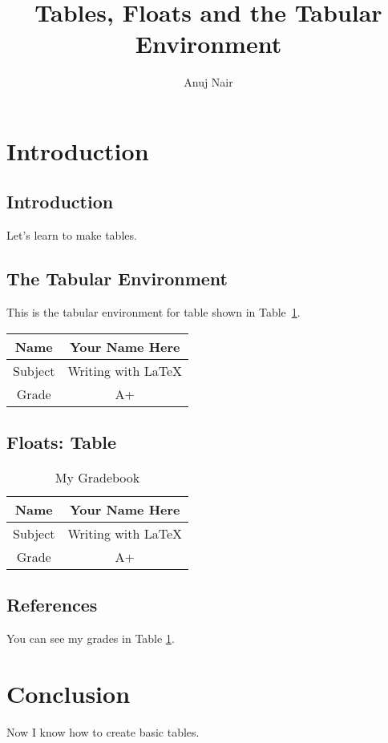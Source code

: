 \documentclass{article}
\title{Tables, Floats and the Tabular Environment}
\author{Anuj Nair}
\date{}
\begin{document}
\maketitle

\section{Introduction}

\subsection{Introduction}

Let's learn to make tables.

\subsection{The Tabular Environment}
This is the tabular environment for table shown in Table~\ref{tab:grades}.

\vspace{0.5cm}

\begin{tabular}{|c||c|}
\hline		
  Name & Your Name Here \\  
\hline
  Subject & Writing with {\LaTeX} \\
\hline
  Grade & A+ \\
\hline
\end{tabular}

\subsection{Floats: Table}

\begin{table}[htbp]
				\caption{My Gradebook}
				\begin{center}
								\begin{tabular}{|c||c|}
								\hline		
									Name & Your Name Here \\  
								\hline
									Subject & Writing with {\LaTeX} \\
								\hline
									Grade & A+ \\
								\hline
								\end{tabular}

				\end{center}
				\label{tab:grades}
\end{table}

\subsection{References}


  You can see my grades in Table \ref{tab:grades}. 






\section{Conclusion}

  Now I know how to create basic tables.
\end{document}
